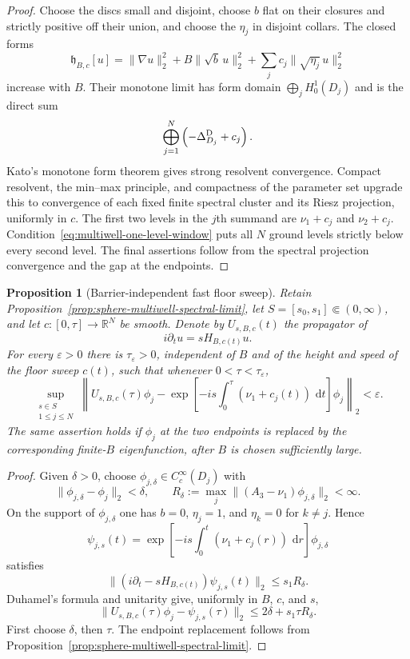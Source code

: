\documentclass[11pt]{article}
\newtheorem{proposition}[theorem]{Proposition}
\theoremstyle{remark}
\newcommand{\dd}{\,\mathrm d}
\begin{document}
\begin{proof}
Choose the discs small and disjoint, choose $b$ flat on their closures and
strictly positive off their union, and choose the $\eta_j$ in disjoint
collars.  The closed forms
\[
 \mathfrak h_{B,c}[u]
 =\|\nabla u\|_2^2+B\|\sqrt b\,u\|_2^2
   +\sum_jc_j\|\sqrt{\eta_j}\,u\|_2^2
\]
increase with $B$.  Their monotone limit has form domain
$\bigoplus_jH^1_0(D_j)$ and is the direct sum
\[
 \bigoplus_{j=1}^N
 \left(-\Delta_{D_j}^{\rm D}+c_j\right).
\]
Kato's monotone form theorem gives strong resolvent convergence.  Compact
resolvent, the min--max principle, and compactness of the parameter set
upgrade this to convergence of each fixed finite spectral cluster and its
Riesz projection, uniformly in $c$.  The first two levels in the $j$th
summand are $\nu_1+c_j$ and $\nu_2+c_j$.
Condition~\eqref{eq:multiwell-one-level-window} puts all $N$ ground levels
strictly below every second level.  The final assertions follow from the
spectral projection convergence and the gap at the endpoints.
\end{proof}

\begin{proposition}[Barrier-independent fast floor sweep]
\label{prop:sphere-fast-floor-sweep}
Retain Proposition~\ref{prop:sphere-multiwell-spectral-limit}, let
$S=[s_0,s_1]\Subset(0,\infty)$, and let
$c:[0,\tau]\to\mathbb R^N$ be smooth.  Denote by $U_{s,B,c}(t)$ the
propagator of
\[
 i\partial_tu=sH_{B,c(t)}u.
\]
For every $\varepsilon>0$ there is $\tau_\varepsilon>0$, independent of
$B$ and of the height and speed of the floor sweep $c(t)$, such that
whenever $0<\tau<\tau_\varepsilon$,
\begin{equation}
 \sup_{\substack{s\in S\\1\leq j\leq N}}
 \left\|
 U_{s,B,c}(\tau)\phi_j
 -
 \exp\!\left[-is\int_0^\tau(\nu_1+c_j(t))\,\dd t\right]\phi_j
 \right\|_2
 <\varepsilon .
 \label{eq:uniform-fast-floor-sweep}
\end{equation}
The same assertion holds if $\phi_j$ at the two endpoints is replaced by
the corresponding finite-$B$ eigenfunction, after $B$ is chosen
sufficiently large.
\end{proposition}

\begin{proof}
Given $\delta>0$, choose
$\phi_{j,\delta}\in C^\infty_c(D_j)$ with
\[
 \|\phi_{j,\delta}-\phi_j\|_2<\delta,\qquad
 R_\delta:=
 \max_j\|(A_3-\nu_1)\phi_{j,\delta}\|_2<\infty.
\]
On the support of $\phi_{j,\delta}$ one has
$b=0$, $\eta_j=1$, and $\eta_k=0$ for $k\neq j$.  Hence
\[
 \psi_{j,s}(t)=
 \exp\!\left[-is\int_0^t(\nu_1+c_j(r))\,\dd r\right]
 \phi_{j,\delta}
\]
satisfies
\[
 \|(i\partial_t-sH_{B,c(t)})\psi_{j,s}(t)\|_2
 \leq s_1R_\delta .
\]
Duhamel's formula and unitarity give, uniformly in $B$, $c$, and $s$,
\[
 \|U_{s,B,c}(\tau)\phi_j-\psi_{j,s}(\tau)\|_2
 \leq 2\delta+s_1\tau R_\delta .
\]
First choose $\delta$, then $\tau$.  The endpoint replacement follows from
Proposition~\ref{prop:sphere-multiwell-spectral-limit}.
\end{proof}
\end{document}

